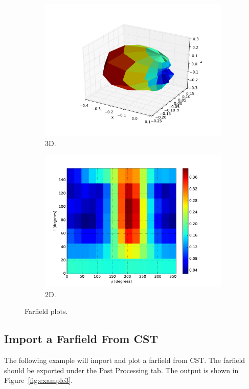 \documentclass[10pt]{article}
\begin{document}
\begin{figure}[htbp]
    \centering
    \begin{subfigure}{0.49\linewidth}
        \centering
        \includegraphics[scale=0.5]{examples/ex2_3dfarfield.pdf}
        \caption{3D.}
    \end{subfigure}
    \hfill
    \begin{subfigure}{0.49\linewidth}
        \centering
        \includegraphics[scale=0.5]{examples/ex2_2dfarfield.pdf}
        \caption{2D.}
    \end{subfigure}
    \caption{Farfield plots.}
    \label{fig:example2}
\end{figure}

\clearpage
\subsection{Import a Farfield From CST}
The following example will import and plot a farfield from CST. The farfield should be exported under the Post Processing tab. The output is shown in Figure~\ref{fig:example3}.
\end{document}
